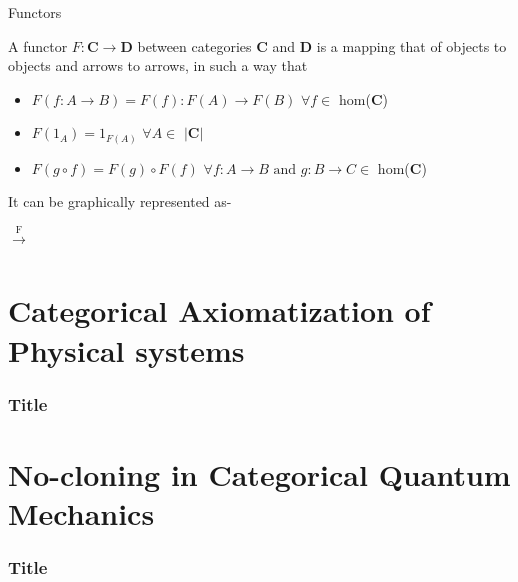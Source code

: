 \documentclass[11pt]{beamer}
\begin{document}
\begin{frame}{Functors}
\begin{definition}
A functor $F : \textbf{C} \rightarrow \textbf{D}$ between categories \textbf{C} and \textbf{D} is a mapping that of objects to objects and arrows to arrows, in such a way that
\begin{itemize}
    \item $F(f : A \rightarrow B) = F(f) : F(A) \rightarrow F(B)$  $\forall f \in$  hom(\textbf{C})
    \item $F(1_A) = 1_{F(A)}$ $\forall A\in $ \(|{\textbf{C}}|\)
    \item $F(g \circ f) = F(g) \circ F(f)$  $\forall f: A\rightarrow B\text{ and }g: B\rightarrow C \in$ hom(\textbf{C})
\end{itemize}
\end{definition}
It can be graphically represented as-\\
$\xrightarrow[]{\text{F}}$
\end{frame}


\section{Categorical Axiomatization of
Physical systems}

\begin{frame}


\frametitle{Title}

\end{frame}

\section{No-cloning in Categorical Quantum
Mechanics}

\begin{frame}
\frametitle{Title}


\end{frame}
\end{document}
